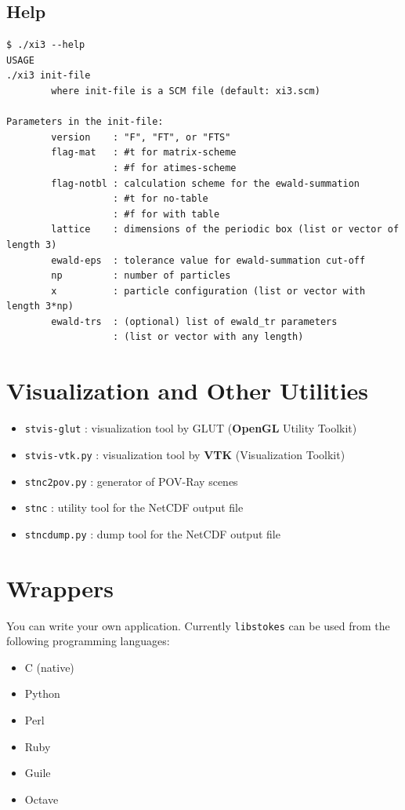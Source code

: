 \documentclass{book}
\begin{document}
\subsection{Help}
{\small
\begin{verbatim}
$ ./xi3 --help
USAGE
./xi3 init-file
        where init-file is a SCM file (default: xi3.scm)

Parameters in the init-file:
        version    : "F", "FT", or "FTS"
        flag-mat   : #t for matrix-scheme
                   : #f for atimes-scheme
        flag-notbl : calculation scheme for the ewald-summation
                   : #t for no-table
                   : #f for with table
        lattice    : dimensions of the periodic box (list or vector of length 3)
        ewald-eps  : tolerance value for ewald-summation cut-off
        np         : number of particles
        x          : particle configuration (list or vector with length 3*np)
        ewald-trs  : (optional) list of ewald_tr parameters
                   : (list or vector with any length)
\end{verbatim}
}


\section{Visualization and Other Utilities}
\begin{itemize}
\item {\tt stvis-glut} : visualization tool by
  GLUT ({\bf OpenGL} Utility Toolkit)\cite{OpenGL}
\item {\tt stvis-vtk.py} : visualization tool by
  {\bf VTK} (Visualization Toolkit)\cite{VTK}
\item {\tt stnc2pov.py} : generator of POV-Ray scenes
\item {\tt stnc} : utility tool for the NetCDF output file
\item {\tt stncdump.py} : dump tool for the NetCDF output file
\end{itemize}


\section{Wrappers}
You can write your own application.
Currently {\tt libstokes} can be used from the following programming languages:
\begin{itemize}
\item C (native)
\item Python
\item Perl
\item Ruby
\item Guile
\item Octave
\end{itemize}
\end{document}
